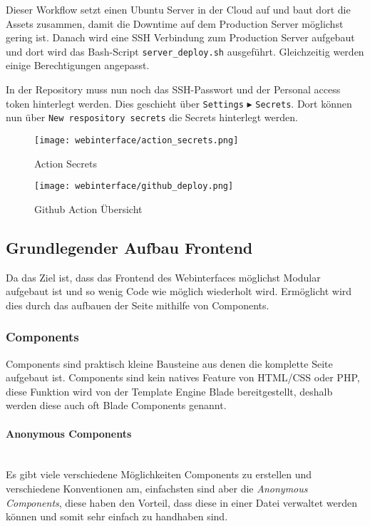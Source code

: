 Dieser Workflow setzt einen Ubuntu Server in der Cloud auf und baut dort die
Assets zusammen, damit die Downtime auf dem Production Server möglichst gering
ist. Danach wird eine SSH Verbindung zum Production Server aufgebaut und dort
wird das Bash-Script \verb|server_deploy.sh| ausgeführt. Gleichzeitig werden
einige Berechtigungen angepasst.

In der Repository muss nun noch das SSH-Passwort und der Personal access token
hinterlegt werden. Dies geschieht über \verb|Settings| $\blacktriangleright$
\verb|Secrets|. Dort können nun über \verb|New respository secrets| die Secrets
hinterlegt werden.

\begin{figure}[H]
  \centering
  \texttt{[image: webinterface/action\_secrets.png]}
  \caption{Action Secrets}
\end{figure}

\begin{figure}[H]
  \centering
  \texttt{[image: webinterface/github\_deploy.png]}
  \caption{Github Action Übersicht}
\end{figure}


\subsection{Grundlegender Aufbau Frontend}

Da das Ziel ist, dass das Frontend des Webinterfaces möglichst Modular aufgebaut ist
und so wenig Code wie möglich wiederholt wird. Ermöglicht wird dies durch das
aufbauen der Seite mithilfe von Components.


\subsubsection{Components}

Components sind praktisch kleine Bausteine aus denen die komplette Seite
aufgebaut ist. Components sind kein natives Feature von HTML/CSS oder PHP, diese
Funktion wird von der Template Engine Blade bereitgestellt, deshalb werden diese
auch oft Blade Components genannt. 

\paragraph{Anonymous Components}\mbox{}\\

Es gibt viele verschiedene Möglichkeiten Components zu erstellen und
verschiedene Konventionen am, einfachsten sind aber die \textit{Anonymous Components}, 
diese haben den Vorteil, dass diese in einer Datei verwaltet werden
können und somit sehr einfach zu handhaben sind.

